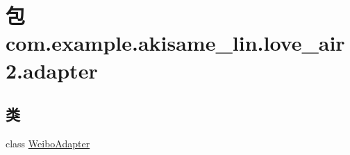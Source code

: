 \hypertarget{namespacecom_1_1example_1_1akisame__lin_1_1love__air2_1_1adapter}{}\section{包 com.\+example.\+akisame\+\_\+lin.\+love\+\_\+air2.\+adapter}
\label{namespacecom_1_1example_1_1akisame__lin_1_1love__air2_1_1adapter}
\subsection*{类}
\begin{DoxyCompactItemize}
\item 
class \mbox{\hyperlink{classcom_1_1example_1_1akisame__lin_1_1love__air2_1_1adapter_1_1_weibo_adapter}{Weibo\+Adapter}}
\end{DoxyCompactItemize}
